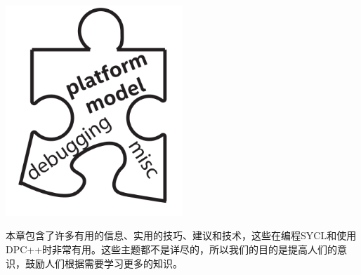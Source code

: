 \begin{center}
	\includegraphics[width=0.5\textwidth]{content/chapter-13/images/1}
\end{center}

本章包含了许多有用的信息、实用的技巧、建议和技术，这些在编程SYCL和使用DPC++时非常有用。这些主题都不是详尽的，所以我们的目的是提高人们的意识，鼓励人们根据需要学习更多的知识。\par